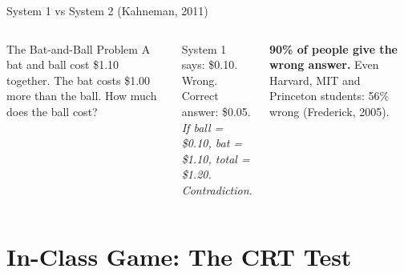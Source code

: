 \documentclass[aspectratio=169]{beamer}
\begin{document}
\begin{frame}{System 1 vs System 2 (Kahneman, 2011)}
\begin{columns}
\begin{alertblock}{The Bat-and-Ball Problem}
A bat and ball cost \$1.10 together. The bat costs \$1.00 more than the ball. How much does the ball cost?
\end{alertblock}
\pause
\begin{block}{System 1 says: \$0.10. \alert{Wrong.}}
Correct answer: \$0.05.\\
\textit{If ball = \$0.10, bat = \$1.10, total = \$1.20. Contradiction.}
\end{block}
\textbf{90\% of people give the wrong answer.} Even Harvard, MIT and Princeton students: 56\% wrong (Frederick, 2005).
\end{columns}
\end{frame}

\section{In-Class Game: The CRT Test}
\end{document}
